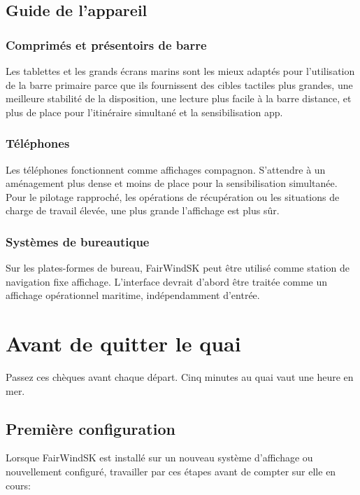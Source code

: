 \section{Guide de l'appareil}

\subsection{Comprimés et présentoirs de barre}

Les tablettes et les grands écrans marins sont les mieux adaptés pour l'utilisation de la barre primaire parce que
ils fournissent des cibles tactiles plus grandes, une meilleure stabilité de la disposition, une lecture plus facile à la barre
distance, et plus de place pour l'itinéraire simultané et la sensibilisation app.

\subsection{Téléphones}

Les téléphones fonctionnent comme affichages compagnon.
S'attendre à un aménagement plus dense et moins de place pour la sensibilisation simultanée.
Pour le pilotage rapproché, les opérations de récupération ou les situations de charge de travail élevée, une plus grande
l'affichage est plus sûr.

\subsection{Systèmes de bureautique}

Sur les plates-formes de bureau, FairWindSK peut être utilisé comme station de navigation fixe
affichage.
L'interface devrait d'abord être traitée comme un affichage opérationnel maritime, indépendamment
d'entrée.

\chapter{Avant de quitter le quai}

Passez ces chèques avant chaque départ.
Cinq minutes au quai vaut une heure en mer.

\section{Première configuration}

Lorsque FairWindSK est installé sur un nouveau système d'affichage ou nouvellement configuré, travailler
par ces étapes avant de compter sur elle en cours:

